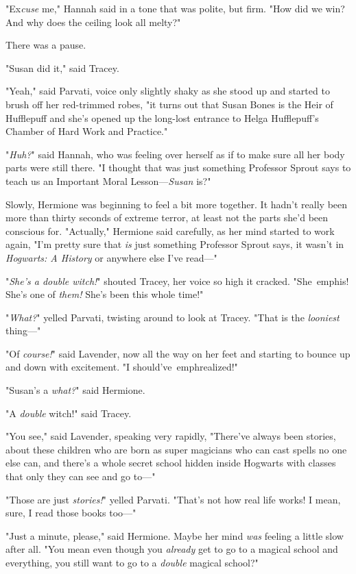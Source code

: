 "Ex\emph{cuse} me," Hannah said in a tone that was polite, but firm. "How did 
we win? And why does the ceiling look all melty?"

There was a pause.

"Susan did it," said Tracey.

"Yeah," said Parvati, voice only slightly shaky as she stood up and started to 
brush off her red-trimmed robes, "it turns out that Susan Bones is the Heir of 
Hufflepuff and she's opened up the long-lost entrance to Helga Hufflepuff's 
Chamber of Hard Work and Practice."

"\emph{Huh?}" said Hannah, who was feeling over herself as if to make sure all 
her body parts were still there. "I thought that was just something Professor 
Sprout says to teach us an Important Moral Lesson---\emph{Susan} is?"

Slowly, Hermione was beginning to feel a bit more together. It hadn't really 
been more than thirty seconds of extreme terror, at least not the parts she'd 
been conscious for. "Actually," Hermione said carefully, as her mind started to 
work again, "I'm pretty sure that \emph{is} just something Professor Sprout 
says, it wasn't in \emph{Hogwarts: A History} or anywhere else I've read---"

"\emph{She's a double witch!}" shouted Tracey, her voice so high it cracked. 
"She\ emph{is!} She's one of \emph{them!} She's been this whole time!"

"\emph{What?}" yelled Parvati, twisting around to look at Tracey. "That is the 
\emph{looniest} thing---"

"Of \emph{course!}" said Lavender, now all the way on her feet and starting to 
bounce up and down with excitement. "I should've\ emph{realized!}"

"Susan's a \emph{what?}" said Hermione.

"A \emph{double} witch!" said Tracey.

"You see," said Lavender, speaking very rapidly, "There've always been stories, 
about these children who are born as super magicians who can cast spells no one 
else can, and there's a whole secret school hidden inside Hogwarts with classes 
that only they can see and go to---"

"Those are just \emph{stories!}" yelled Parvati. "That's not how real life 
works! I mean, sure, I read those books too---"

"Just a minute, please," said Hermione. Maybe her mind \emph{was} feeling a 
little slow after all. "You mean even though you \emph{already} get to go to a 
magical school and everything, you still want to go to a \emph{double} magical 
school?"

